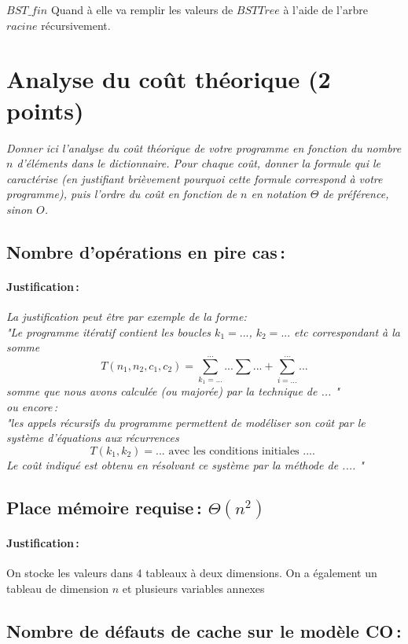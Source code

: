 \documentclass[a4paper, 10pt, french]{article}
\begin{document}
$BST\_fin$ Quand à elle va remplir les valeurs de $BSTTree$ à l'aide de l'arbre $racine$ récursivement.
\section{Analyse du coût théorique (2 points)}
{\em Donner ici l'analyse du coût théorique de votre programme en fonction du nombre $n$ d'éléments dans le dictionnaire.
 Pour chaque coût, donner la formule qui le caractérise (en justifiant brièvement pourquoi cette formule correspond à votre programme),
 puis l'ordre du coût en fonction de $n$ en notation $\Theta$ de préférence, sinon $O$.}

  \subsection{Nombre  d'opérations en pire cas\,: }
    \paragraph{Justification\,: }
    {\em La justification peut être par exemple de la forme: \\
       "Le programme itératif contient les boucles $k_1=...$, $k_2= ...$ etc correspondant à la somme
      $$T(n_1, n_2, c_1, c_2) = \sum_{k_1=...}^{...} ... \sum ... + \sum_{i=...}^{...} ...$$
      somme que nous avons calculée (ou majorée) par la technique de  ... " \\
      ou  encore\,:  \\
      "les appels récursifs du programme permettent de modéliser son coût par le système d'équations aux récurrences
      $$T(k_1, k_2) = ...  \mbox{~avec~les~conditions~initiales~....~} $$
      Le coût indiqué est obtenu en résolvant ce système par la méthode de  .... "
    }
  \subsection{Place mémoire requise\,: $\Theta(n^2)$ }
    \paragraph{Justification\,: }
    On stocke les valeurs dans 4 tableaux à deux dimensions. On a également un tableau de dimension $n$ et plusieurs variables annexes
  \subsection{Nombre de défauts de cache sur le modèle CO\,: }
\end{document}
